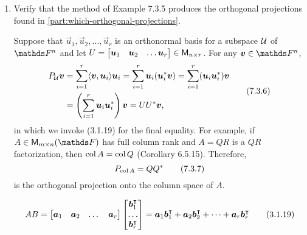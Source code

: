 \documentclass{../homework}
\begin{document}
\begin{description}
\begin{enumerate}
\begin{solution}
    \end{solution}

  \item Verify that the method of Example 7.3.5 produces the
    orthogonal projections found in
    \ref{part:which-orthogonal-projections}.

    \begin{bookexample}[7.3.5]
      Suppose that \(\vec u_1, \vec u_2, \dots, \vec u_r\) is an
      orthonormal basis for a subspace \(\mathcal{U}\) of \(\FF^n\) and
      let \(U =
      \begin{bmatrix}
        \vec u_1 & \vec u_2 & \dots \vec u_r
      \end{bmatrix}
      \in \M_{n \times r}\).  For any \(\vec v \in \FF^n\),
      \begin{align*}
        \begin{split}
          P_\Uspace \vec v
          &= \sum_{i=1}^r \inner{\vec v, \vec u_i} \vec u_i
          = \sum_{i=1}^r \vec u_i (\vec u_i^* \vec v)
          = \sum_{i=1}^r (\vec u_i \vec u_i^*) \vec v \\
          &= \Paren{\sum_{i=1}^r \vec u_i \vec u_i^*} \vec v
          = U U^* \vec v,
        \end{split}
        \tag{7.3.6}
      \end{align*}
      in which we invoke (3.1.19) for the final equality.  For
      example, if \(A \in \M_{m \times n} (\FF)\) has full column rank
      and \(A = QR\) is a \(QR\) factorization, then
      \(\operatorname{col} A = \operatorname{col} Q\) (Corollary 6.5.15).  Therefore,
      \[
        P_{\operatorname{col} A} = Q Q^*
        \tag{7.3.7}
      \]
      is the orthogonal projection onto the column space of \(A\).
    \end{bookexample}

    \begin{book}
      \[
        AB =
        \begin{bmatrix}
          \vec a_1 & \vec a_2 & \dots & \vec a_r
        \end{bmatrix}
        \begin{bmatrix}
          \vec b_1^\transpose \\ \dots \\ \vec b_r^\transpose
        \end{bmatrix}
        = \vec a_1 \vec b_1^\transpose
        + \vec a_2 \vec b_2^\transpose
        + \dots
        + \vec a_r \vec b_r^\transpose
        \tag{3.1.19}
      \]
    \end{book}


\end{enumerate}
\end{description}
\end{document}
